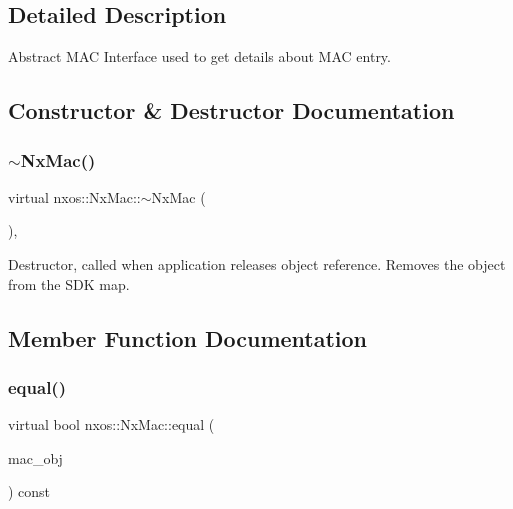 \subsection{Detailed Description}
Abstract M\+AC Interface used to get details about M\+AC entry. 

\subsection{Constructor \& Destructor Documentation}
\mbox{\label{classnxos_1_1_nx_mac_a54a2228786abb8df6429123aa39795cb}} 
\subsubsection{\texorpdfstring{$\sim$\+Nx\+Mac()}{~NxMac()}}
{\footnotesize\ttfamily virtual nxos\+::\+Nx\+Mac\+::$\sim$\+Nx\+Mac (\begin{DoxyParamCaption}{ }\end{DoxyParamCaption})\hspace{0.3cm}{\ttfamily [inline]}, {\ttfamily [virtual]}}

Destructor, called when application releases object reference. Removes the object from the S\+DK map. 

\subsection{Member Function Documentation}
\mbox{\label{classnxos_1_1_nx_mac_a9a4529b39d875b2dd54b0208d1a61c1a}} 
\subsubsection{\texorpdfstring{equal()}{equal()}}
{\footnotesize\ttfamily virtual bool nxos\+::\+Nx\+Mac\+::equal (\begin{DoxyParamCaption}\item[{\mbox{\hyperlink{classnxos_1_1_nx_mac}{Nx\+Mac}} const \&}]{mac\+\_\+obj }\end{DoxyParamCaption}) const\hspace{0.3cm}{\ttfamily [pure virtual]}}

